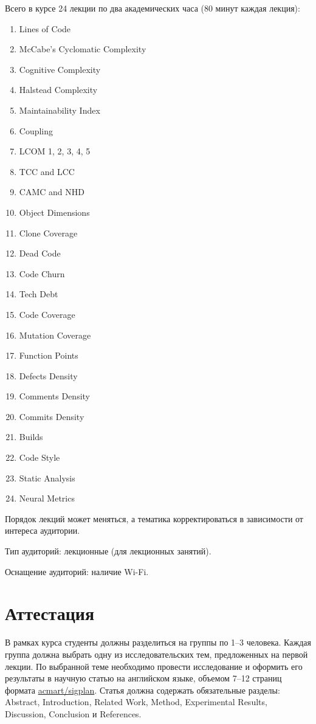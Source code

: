 \documentclass[nobrand,anonymous,nodate,nosecurity]{huawei}
\begin{document}
{Всего в курсе 24 лекции по два академических часа (80 минут каждая лекция):
\begin{enumerate}
    \setlength\itemsep{0em}
    \item Lines of Code
    \item McCabe's Cyclomatic Complexity
    \item Cognitive Complexity
    \item Halstead Complexity
    \item Maintainability Index
    \item Coupling
    \item LCOM 1, 2, 3, 4, 5
    \item TCC and LCC
    \item CAMC and NHD
    \item Object Dimensions
    \item Clone Coverage
    \item Dead Code
    \item Code Churn
    \item Tech Debt
    \item Code Coverage
    \item Mutation Coverage
    \item Function Points
    \item Defects Density
    \item Comments Density
    \item Commits Density
    \item Builds
    \item Code Style
    \item Static Analysis
    \item Neural Metrics
\end{enumerate}

Порядок лекций может меняться, а тематика корректироваться в зависимости от интереса аудитории.

Тип аудиторий: лекционные (для лекционных занятий).

Оснащение аудиторий: наличие Wi-Fi.

\section{Аттестация}

В рамках курса студенты должны разделиться на группы по 1--3 человека. Каждая группа должна выбрать одну из исследовательских тем, предложенных на первой лекции. По выбранной теме необходимо провести исследование и оформить его результаты в научную статью на английском языке, объемом 7--12 страниц формата \href{https://ctan.org/pkg/acmart}{acmart/sigplan}. Статья должна содержать обязательные разделы: Abstract, Introduction, Related Work, Method, Experimental Results, Discussion, Conclusion и References.

}
\end{document}
